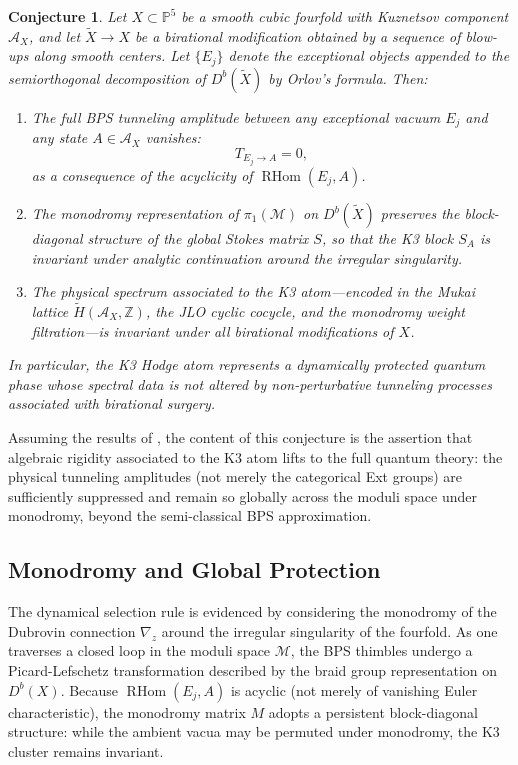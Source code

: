 \documentclass[12pt,reqno]{amsart}
\newtheorem{conjecture}[theorem]{Conjecture}
\theoremstyle{remark} \newtheorem{remark}[theorem]{Remark}
\begin{document}
\begin{conjecture}\label{conj:selection-rule}
Let $X \subset \mathbb{P}^5$ be a smooth cubic fourfold with Kuznetsov
component $\mathcal{A}_X$, and let $\widetilde{X} \to X$ be a
birational modification obtained by a sequence of blow-ups along
smooth centers. Let $\{E_j\}$ denote the exceptional objects appended
to the semiorthogonal decomposition of $D^b(\widetilde{X})$ by Orlov's
formula. Then:
\begin{enumerate}
  \item[\emph{(i)}] The full BPS tunneling amplitude between any
    exceptional vacuum $E_j$ and any state $A \in \mathcal{A}_X$
    vanishes:
    \[
      T_{E_j \to A} = 0,
    \]
    as a consequence of the acyclicity of $\operatorname{RHom}(E_j,
    A)$.
  \item[\emph{(ii)}] The monodromy representation of
    $\pi_1(\mathcal{M})$ on $D^b(\widetilde{X})$ preserves the
    block-diagonal structure of the global Stokes matrix $S$, so that
    the K3 block $S_A$ is invariant under analytic continuation around
    the irregular singularity.
  \item[\emph{(iii)}] The physical spectrum associated to the K3
    atom---encoded in the Mukai lattice $\widetilde{H}(\mathcal{A}_X,
    \mathbb{Z})$, the JLO cyclic cocycle, and the monodromy weight
    filtration---is invariant under all birational modifications of
    $X$.
\end{enumerate}
In particular, the K3 Hodge atom represents a dynamically protected
quantum phase whose spectral data is not altered by
non-perturbative tunneling processes associated with birational
surgery.
\end{conjecture}

Assuming the results of \cite{KKPY2025}, the content of this
conjecture is the assertion that algebraic rigidity associated to the K3 atom
lifts to the
full quantum theory: the physical tunneling amplitudes (not
merely the categorical Ext groups) are sufficiently suppressed and remain so
globally across the moduli space under monodromy, beyond the
semi-classical BPS approximation.

\subsection{Monodromy and Global Protection}

The dynamical selection rule is evidenced by considering the monodromy of
the Dubrovin connection $\nabla_z$ around the irregular
singularity of the fourfold. As one traverses a closed loop in the moduli space
$\mathcal{M}$, the BPS thimbles undergo a Picard-Lefschetz
transformation described by the braid group representation on
$D^b(X)$. Because $\operatorname{RHom}(E_j, A)$ is acyclic (not merely
of vanishing Euler characteristic), the monodromy matrix $M$ adopts a
persistent block-diagonal structure: while the ambient vacua may be
permuted under monodromy, the K3 cluster remains invariant.
\end{document}
